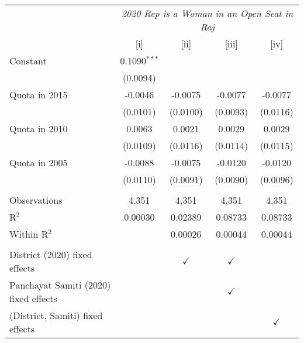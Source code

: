 
\begingroup
\centering
\begin{tabular}{lcccc}
   \toprule
    & \multicolumn{4}{c}{\textit{2020 Rep is a Woman in an Open Seat in Raj}}\\
                                         & [i]            & [ii]          & [iii]         & [iv]\\  
   \midrule 
   Constant                              & 0.1090$^{***}$ &               &               &   \\   
                                         & (0.0094)       &               &               &   \\   
   Quota in 2015                         & -0.0046        & -0.0075       & -0.0077       & -0.0077\\   
                                         & (0.0101)       & (0.0100)      & (0.0093)      & (0.0116)\\   
   Quota in 2010                         & 0.0063         & 0.0021        & 0.0029        & 0.0029\\   
                                         & (0.0109)       & (0.0116)      & (0.0114)      & (0.0115)\\   
   Quota in 2005                         & -0.0088        & -0.0075       & -0.0120       & -0.0120\\   
                                         & (0.0110)       & (0.0091)      & (0.0090)      & (0.0096)\\   
    \\
   Observations                          & 4,351          & 4,351         & 4,351         & 4,351\\  
   R$^2$                                 & 0.00030        & 0.02389       & 0.08733       & 0.08733\\  
   Within R$^2$                          &                & 0.00026       & 0.00044       & 0.00044\\  
    \\
   District (2020) fixed effects         &                & $\checkmark$  & $\checkmark$  & \\  
   Panchayat Samiti (2020) fixed effects &                &               & $\checkmark$  & \\  
   (District, Samiti) fixed effects      &                &               &               & $\checkmark$\\   
   \bottomrule
\end{tabular}
\par\endgroup


